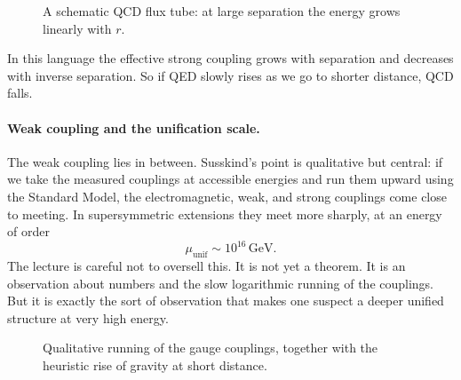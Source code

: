 \begin{figure}[h]
\centering
{}
\caption{A schematic QCD flux tube: at large separation the energy grows linearly with \(r\).}
\end{figure}

In this language the effective strong coupling grows with separation and decreases with inverse separation. So if QED slowly rises as we go to shorter distance, QCD falls.

\paragraph{Weak coupling and the unification scale.}
The weak coupling lies in between. Susskind's point is qualitative but central: if we take the measured couplings at accessible energies and run them upward using the Standard Model, the electromagnetic, weak, and strong couplings come close to meeting. In supersymmetric extensions they meet more sharply, at an energy of order
\begin{equation}
\mu_{\mathrm{unif}}\sim 10^{16}\,\mathrm{GeV}.
\end{equation}
The lecture is careful not to oversell this. It is not yet a theorem. It is an observation about numbers and the slow logarithmic running of the couplings. But it is exactly the sort of observation that makes one suspect a deeper unified structure at very high energy.

\begin{figure}[h]
\centering
{}
\caption{Qualitative running of the gauge couplings, together with the heuristic rise of gravity at short distance.}
\end{figure}

